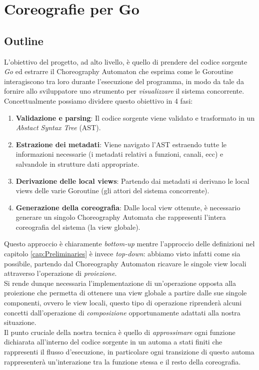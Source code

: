 \chapter{Coreografie per Go}
\section{Outline} \label{sec:GoOutline}
L'obiettivo del progetto, ad alto livello, è quello di prendere del codice sorgente \emph{Go} ed estrarre il Choreography Automaton che esprima come le Goroutine interagiscono tra loro durante l'esecuzione del programma, in modo da tale da fornire allo sviluppatore uno strumento per \emph{visualizzare} il sistema concorrente.\\
Concettualmente possiamo dividere questo obiettivo in 4 fasi:
\begin{enumerate}
    \item \textbf{Validazione e parsing}: Il codice sorgente viene validato e trasformato in un \emph{Abstact Syntax Tree} (AST).
    \item \textbf{Estrazione dei metadati}: Viene navigato l'AST estraendo tutte le informazioni necessarie (i metadati relativi a funzioni, canali, ecc) e salvandole in strutture dati appropriate.
    \item \textbf{Derivazione delle local views}: Partendo dai metadati si derivano le local views delle varie Goroutine (gli attori del sistema concorrente).
    \item \textbf{Generazione della coreografia}: Dalle local view ottenute, è necessario generare un singolo Choreography Automata che rappresenti l'intera coreografia del sistema (la view globale).
\end{enumerate}
Questo approccio è chiaramente \emph{bottom-up} mentre l'approccio delle definizioni nel capitolo \ref{cap:Preliminaries} è invece \emph{top-down}: abbiamo visto infatti come sia possibile, partendo dal Choreography Automaton ricavare le singole view locali attraverso l'operazione di \emph{proiezione}.\\
Si rende dunque necessaria l'implementazione di un'operazione opposta alla proiezione che permetta di ottenere una view globale a partire dalle sue singole componenti, ovvero le view locali, questo tipo di operazione riprenderà alcuni concetti dall'operazione di \emph{composizione} opportunamente adattati alla nostra situazione. \\
Il punto cruciale della nostra tecnica è quello di \emph{approssimare} ogni funzione dichiarata all'interno del codice sorgente in un automa a stati finiti che rappresenti il flusso d'esecuzione, in particolare ogni transizione di questo automa rappresenterà un'interazione tra la funzione stessa e il resto della coreografia. \bigskip \\

